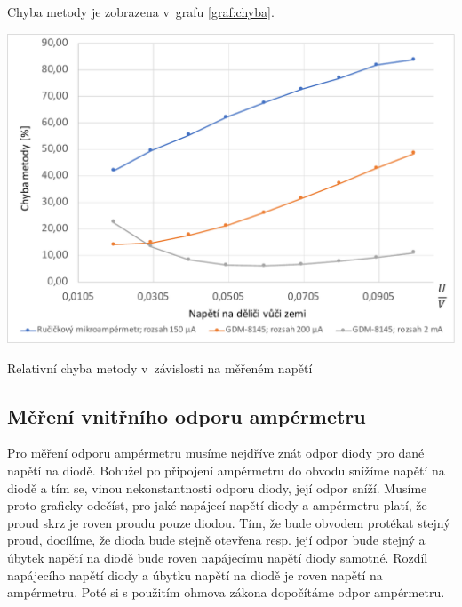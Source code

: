 \documentclass[a4paper,12pt]{article}   %
\begin{document}
Chyba metody je zobrazena v~grafu \ref{graf:chyba}.
\begin{graf}
    \centering
    \includegraphics[width=.8\textwidth]{graf_chyba.pdf}
    \caption{Relativní chyba metody v~závislosti na měřeném napětí}
    \label{graf:chyba}
\end{graf}

\subsection{Měření vnitřního odporu ampérmetru}
Pro měření odporu ampérmetru musíme nejdříve znát odpor diody pro dané napětí na diodě. Bohužel po připojení ampérmetru do obvodu snížíme napětí na diodě a tím se, vinou nekonstantnosti odporu diody, její odpor sníží. Musíme proto graficky odečíst, pro jaké napájecí napětí diody a ampérmetru platí, že proud skrz je roven proudu pouze diodou. Tím, že bude obvodem protékat stejný proud, docílíme, že dioda bude stejně otevřena resp. její odpor bude stejný a úbytek napětí na diodě bude roven napájecímu napětí diody samotné. Rozdíl napájecího napětí diody a úbytku napětí na diodě je roven napětí na ampérmetru. Poté si s použitím ohmova zákona dopočítáme odpor ampérmetru.
\end{document}
